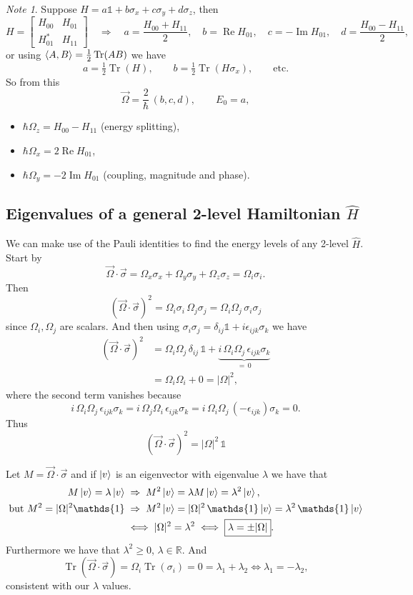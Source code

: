 \documentclass[12pt]{article}
\theoremstyle{plain}
\theoremstyle{remark}
\newtheorem*{note}{Note}
\newcommand{\I}{\mathds{1}}
\newcommand{\R}{\mathbb{R}}
\newcommand{\vecb}[1]{\vec{#1}}
\newcommand{\Om}{\vecb{\Omega}}
\newcommand{\sig}{\vecb{\sigma}}
\DeclareMathOperator{\Tr}{Tr}
\DeclareMathOperator{\Real}{Re}
\DeclareMathOperator{\Imag}{Im}
\begin{document}
\begin{note}
Suppose $H = a\I + b\sigma_x + c\sigma_y + d\sigma_z$, then
\[
  H = \begin{bmatrix} H_{00} & H_{01} \\ H_{01}^* & H_{11} \end{bmatrix}
  \quad\Rightarrow\quad
  a = \frac{H_{00} + H_{11}}{2}, \quad b = \Real H_{01}, \quad c = -\Imag H_{01}, \quad d = \frac{H_{00} - H_{11}}{2} ,
\]
or using $\braket{A, B} = \tfrac12 \Tr(AB)$ we have
\[
  a = \tfrac12\Tr(H), \qquad b = \tfrac12\Tr(H\sigma_x), \qquad \text{etc.}
\]
So from this
\[
  \Om = \frac{2}{\hbar}\,(b, c, d), \qquad E_0 = a ,
\]
\begin{itemize}
  \item $\hbar\Omega_z = H_{00} - H_{11}$ \quad (energy splitting),
  \item $\hbar\Omega_x = 2\Real H_{01}$,
  \item $\hbar\Omega_y = -2\Imag H_{01}$ \quad (coupling, magnitude and phase).
\end{itemize}
\end{note}

\subsection{Eigenvalues of a general 2-level Hamiltonian $\hat H$}

We can make use of the Pauli identities to find the energy levels of any 2-level $\hat H$. Start by
\[
  \Om\cdot\sig = \Omega_x\sigma_x + \Omega_y\sigma_y + \Omega_z\sigma_z = \Omega_i\sigma_i .
\]
Then
\[
  (\Om\cdot\sig)^2 = \Omega_i\sigma_i\,\Omega_j\sigma_j = \Omega_i\Omega_j\,\sigma_i\sigma_j
\]
since $\Omega_i, \Omega_j$ are scalars. And then using $\sigma_i\sigma_j = \delta_{ij}\I + i\epsilon_{ijk}\sigma_k$ we have
\begin{align*}
  (\Om\cdot\sig)^2 &= \Omega_i\Omega_j\,\delta_{ij}\,\I + \underbrace{i\,\Omega_i\Omega_j\,\epsilon_{ijk}\sigma_k}_{=\,0} \\
                   &= \Omega_i\Omega_i + 0 = |\Omega|^2 ,
\end{align*}
where the second term vanishes because
\[
  i\,\Omega_i\Omega_j\,\epsilon_{ijk}\sigma_k = i\,\Omega_j\Omega_i\,\epsilon_{ijk}\sigma_k
  = i\,\Omega_i\Omega_j\,(-\epsilon_{ijk})\sigma_k = 0 .
\]
Thus
\[
  \boxed{\; (\Om\cdot\sig)^2 = |\Omega|^2\,\I \;}
\]

Let $M = \Om\cdot\sig$ and if $\ket{v}$ is an eigenvector with eigenvalue $\lambda$ we have that
\begin{align*}
  M\ket{v} = \lambda\ket{v}
  &\;\Rightarrow\; M^2\ket{v} = \lambda M\ket{v} = \lambda^2\ket{v} , \\
  \text{but } M^2 = |\Omega|^2\I
  &\;\Rightarrow\; M^2\ket{v} = |\Omega|^2\,\I\ket{v} = \lambda^2\,\I\ket{v} \\
  &\iff |\Omega|^2 = \lambda^2 \iff \boxed{\lambda = \pm|\Omega|} .
\end{align*}
Furthermore we have that $\lambda^2 \geq 0$, $\lambda \in \R$. And
\[
  \Tr(\Om\cdot\sig) = \Omega_i\Tr(\sigma_i) = 0 = \lambda_1 + \lambda_2 \iff \lambda_1 = -\lambda_2 ,
\]
consistent with our $\lambda$ values.
\end{document}
